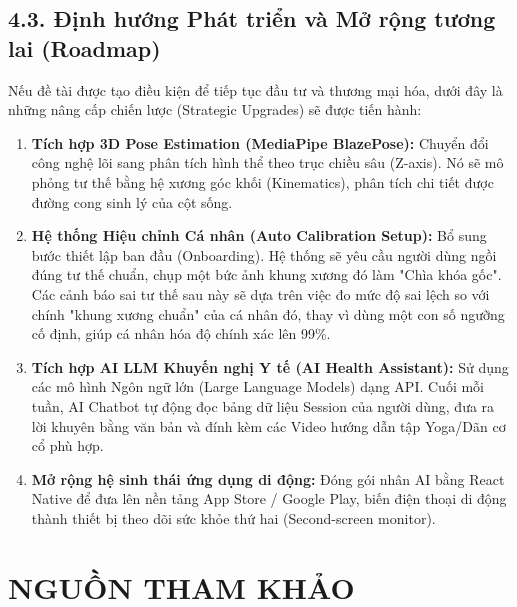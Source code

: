 \documentclass[12pt,a4paper]{report}
\begin{document}
\section{4.3. Định hướng Phát triển và Mở rộng tương lai (Roadmap)}
Nếu đề tài được tạo điều kiện để tiếp tục đầu tư và thương mại hóa, dưới đây là những nâng cấp chiến lược (Strategic Upgrades) sẽ được tiến hành:
\begin{enumerate}
    \item \textbf{Tích hợp 3D Pose Estimation (MediaPipe BlazePose):} Chuyển đổi công nghệ lõi sang phân tích hình thể theo trục chiều sâu (Z-axis). Nó sẽ mô phỏng tư thế bằng hệ xương góc khối (Kinematics), phân tích chi tiết được đường cong sinh lý của cột sống.
    \item \textbf{Hệ thống Hiệu chỉnh Cá nhân (Auto Calibration Setup):} Bổ sung bước thiết lập ban đầu (Onboarding). Hệ thống sẽ yêu cầu người dùng ngồi đúng tư thế chuẩn, chụp một bức ảnh khung xương đó làm "Chìa khóa gốc". Các cảnh báo sai tư thế sau này sẽ dựa trên việc đo mức độ sai lệch so với chính "khung xương chuẩn" của cá nhân đó, thay vì dùng một con số ngưỡng cố định, giúp cá nhân hóa độ chính xác lên 99\%.
    \item \textbf{Tích hợp AI LLM Khuyến nghị Y tế (AI Health Assistant):} Sử dụng các mô hình Ngôn ngữ lớn (Large Language Models) dạng API. Cuối mỗi tuần, AI Chatbot tự động đọc bảng dữ liệu Session của người dùng, đưa ra lời khuyên bằng văn bản và đính kèm các Video hướng dẫn tập Yoga/Dãn cơ cổ phù hợp.
    \item \textbf{Mở rộng hệ sinh thái ứng dụng di động:} Đóng gói nhân AI bằng React Native để đưa lên nền tảng App Store / Google Play, biến điện thoại di động thành thiết bị theo dõi sức khỏe thứ hai (Second-screen monitor).
\end{enumerate}

\newpage
\chapter*{NGUỒN THAM KHẢO}
\end{document}
